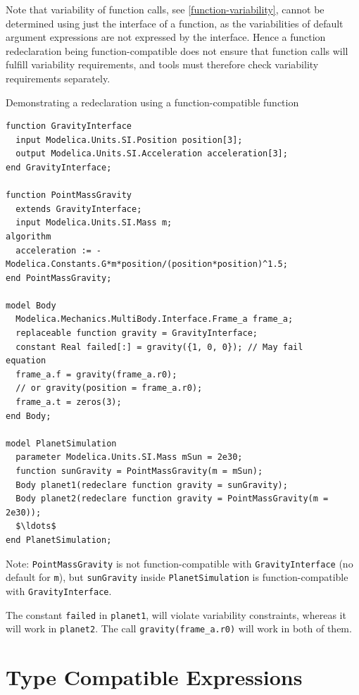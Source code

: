 Note that variability of function calls, see \cref{function-variability}, cannot be determined using just the interface of a function, as the variabilities of default argument expressions are not expressed by the interface.
Hence a function redeclaration being function-compatible does not ensure that function calls will fulfill variability requirements, and tools must therefore check variability requirements separately.

\begin{example}
Demonstrating a redeclaration using a function-compatible function
\begin{lstlisting}[language=modelica]
function GravityInterface
  input Modelica.Units.SI.Position position[3];
  output Modelica.Units.SI.Acceleration acceleration[3];
end GravityInterface;

function PointMassGravity
  extends GravityInterface;
  input Modelica.Units.SI.Mass m;
algorithm
  acceleration := -Modelica.Constants.G*m*position/(position*position)^1.5;
end PointMassGravity;

model Body
  Modelica.Mechanics.MultiBody.Interface.Frame_a frame_a;
  replaceable function gravity = GravityInterface;
  constant Real failed[:] = gravity({1, 0, 0}); // May fail
equation
  frame_a.f = gravity(frame_a.r0);
  // or gravity(position = frame_a.r0);
  frame_a.t = zeros(3);
end Body;

model PlanetSimulation
  parameter Modelica.Units.SI.Mass mSun = 2e30;
  function sunGravity = PointMassGravity(m = mSun);
  Body planet1(redeclare function gravity = sunGravity);
  Body planet2(redeclare function gravity = PointMassGravity(m = 2e30));
  $\ldots$
end PlanetSimulation;
\end{lstlisting}

Note: \lstinline!PointMassGravity! is not function-compatible with \lstinline!GravityInterface! (no default for \lstinline!m!), but \lstinline!sunGravity! inside \lstinline!PlanetSimulation! is function-compatible with \lstinline!GravityInterface!.

The constant \lstinline!failed! in \lstinline!planet1!, will violate variability constraints, whereas it will work in \lstinline!planet2!.
The call \lstinline!gravity(frame_a.r0)! will work in both of them.
\end{example}

\section{Type Compatible Expressions}\label{type-compatible-expressions}

